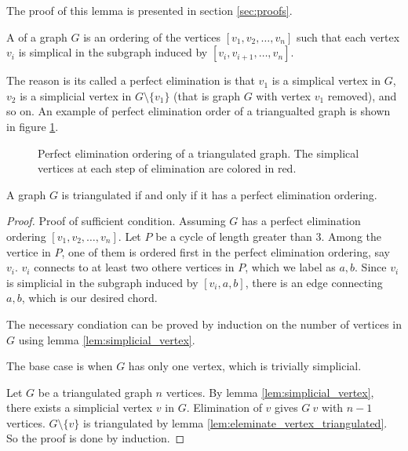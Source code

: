The proof of this lemma is presented in section \ref{sec:proofs}.

\begin{definition}
	A  of a graph $G$ is an ordering of the vertices $[v_1, v_2, \ldots, v_n]$ such that each vertex $v_i$ is simplical in the subgraph induced by $[v_i, v_{i+1}, \ldots, v_n]$.
\end{definition}

The reason is its called a perfect elimination is that $v_1$ is a simplical vertex in $G$, $v_2$ is a simplicial vertex in $G \setminus \{v_1\}$ (that is graph $G$ with vertex $v_1$ removed), and so on.
An example of perfect elimination order of a triangualted graph is shown in figure \ref{fig:perfect_elimination_ordering}.

\begin{figure}[ht]
	\centering
	
	\caption{Perfect elimination ordering of a triangulated graph. The simplical vertices at each step of elimination are colored in red. }
	\label{fig:perfect_elimination_ordering}
\end{figure}

\begin{theorem}\label{thm:triangulated_perfect_elimination_ordering}
	A graph $G$ is triangulated if and only if it has a perfect elimination ordering.
\end{theorem}

\begin{proof}
	Proof of sufficient condition. Assuming $G$ has a perfect elimination ordering $[v_1, v_2, \ldots, v_n]$. Let $P$ be a cycle of length greater than 3.
	Among the vertice in $P$, one of them is ordered first in the perfect elimination ordering, say $v_i$.
	$v_i$ connects to at least two othere vertices in $P$, which we label as $a, b$. 
	Since $v_i$ is simplicial in the subgraph induced by $[v_i, a, b]$, there is an edge connecting $a, b$, which is our desired chord.

	The necessary condiation can be proved by induction on the number of vertices in $G$ using lemma \ref{lem:simplicial_vertex}.
	
	The base case is when $G$ has only one vertex, which is trivially simplicial.

	Let $G$ be a triangulated graph $n$ vertices. By lemma \ref{lem:simplicial_vertex}, there exists a simplicial vertex $v$ in $G$.
	Elimination of $v$ gives $G \ v$ with $n-1$ vertices. 
	$G\setminus \{v\}$ is triangulated by lemma \ref{lem:eleminate_vertex_triangulated}. So the proof is done by induction.
\end{proof}

